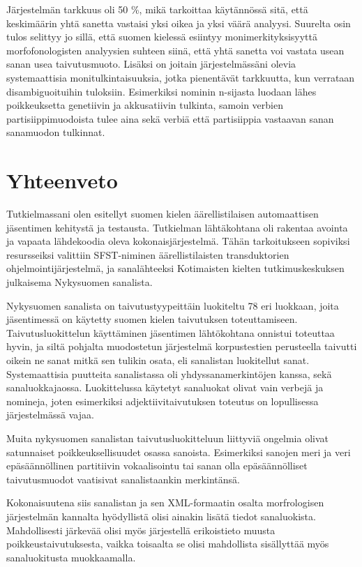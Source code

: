 \documentclass[free]{flammie}
\begin{document}
        Järjestelmän tarkkuus oli 50 \%, mikä tarkoittaa käytännössä sitä, että keskimäärin yhtä sanetta vastaisi yksi oikea ja yksi väärä analyysi. Suurelta osin tulos selittyy jo sillä, että suomen kielessä esiintyy monimerkityksisyyttä morfofonologisten analyysien suhteen siinä, että yhtä sanetta voi vastata usean sanan usea
taivutusmuoto. Lisäksi on joitain järjestelmässäni olevia systemaattisia monitulkintaisuuksia, jotka pienentävät tarkkuutta, kun verrataan disambiguoituihin tuloksiin. Esimerkiksi nominin n-sijasta luodaan lähes poikkeuksetta genetiivin ja
akkusatiivin tulkinta, samoin verbien partisiippimuodoista tulee aina sekä verbiä
että partisiippia vastaavan sanan sanamuodon tulkinnat.

\section{Yhteenveto} \label{sec:yhteenveto}

Tutkielmassani olen esitellyt suomen kielen äärellistilaisen automaattisen jäsentimen kehitystä ja testausta. Tutkielman lähtäkohtana oli rakentaa avointa ja vapaata
lähdekoodia oleva kokonaisjärjestelmä. Tähän tarkoitukseen sopiviksi resursseiksi valittiin SFST-niminen äärellistilaisten transduktorien ohjelmointijärjestelmä,
ja sanalähteeksi Kotimaisten kielten tutkimuskeskuksen julkaisema Nykysuomen
sanalista.

Nykysuomen sanalista on taivutustyypeittäin luokiteltu 78 eri luokkaan, joita jäsentimessä on käytetty suomen kielen taivutuksen toteuttamiseen. Taivutusluokittelun käyttäminen jäsentimen lähtökohtana onnistui toteuttaa hyvin, ja siltä pohjalta muodostetun järjestelmä korpustestien perusteella taivutti oikein ne sanat
mitkä sen tulikin osata, eli sanalistan luokitellut sanat. Systemaattisia puutteita sanalistassa oli yhdyssanamerkintöjen kanssa, sekä sanaluokkajaossa. Luokittelussa
käytetyt sanaluokat olivat vain verbejä ja nomineja, joten esimerkiksi adjektiivitaivutuksen toteutus on lopullisessa järjestelmässä vajaa.

Muita nykysuomen sanalistan taivutusluokitteluun liittyviä ongelmia olivat satunnaiset poikkeuksellisuudet osassa sanoista. Esimerkiksi sanojen meri ja veri epäsäännöllinen partitiivin vokaalisointu tai sanan olla epäsäännölliset taivutusmuodot vaatisivat sanalistaankin merkintänsä.

Kokonaisuutena siis sanalistan ja sen XML-formaatin osalta morfrologisen järjestelmän kannalta hyödyllistä olisi ainakin lisätä tiedot sanaluokista. Mahdollisesti
järkevää olisi myös järjestellä erikoistieto muusta poikkeustaivutuksesta, vaikka
toisaalta se olisi mahdollista sisällyttää myös sanaluokitusta muokkaamalla.
\end{document}
